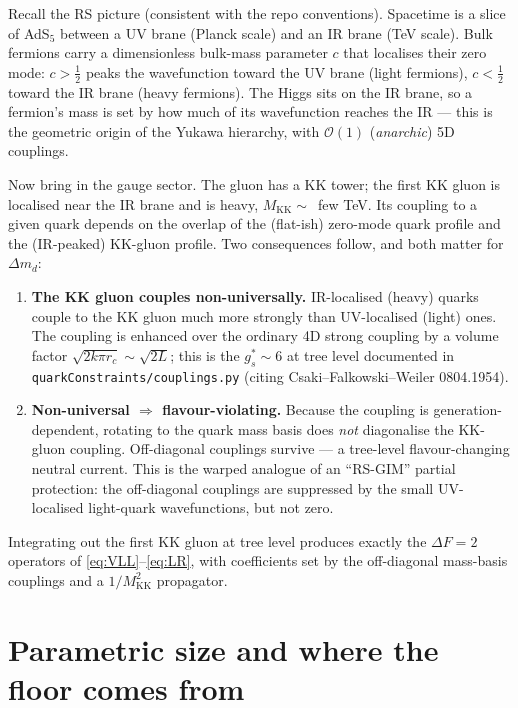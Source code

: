 \documentclass[11pt]{article}
\newcommand{\MKK}{M_{\mathrm{KK}}}
\newcommand{\dmd}{\Delta m_d}
\newcommand{\code}[1]{\texttt{#1}}
\theoremstyle{definition}
\begin{document}
Recall the RS picture (consistent with the repo conventions). Spacetime is a
slice of AdS$_5$ between a UV brane (Planck scale) and an IR brane (TeV scale).
Bulk fermions carry a dimensionless bulk-mass parameter $c$ that localises their
zero mode: $c>\tfrac12$ peaks the wavefunction toward the UV brane (light
fermions), $c<\tfrac12$ toward the IR brane (heavy fermions). The Higgs sits on
the IR brane, so a fermion's mass is set by how much of its wavefunction reaches
the IR --- this is the geometric origin of the Yukawa hierarchy, with
$\mathcal{O}(1)$ (\emph{anarchic}) 5D couplings.

Now bring in the gauge sector. The gluon has a KK tower; the first KK gluon is
localised near the IR brane and is heavy, $\MKK\sim$~few TeV. Its coupling to a
given quark depends on the overlap of the (flat-ish) zero-mode quark profile and
the (IR-peaked) KK-gluon profile. Two consequences follow, and both matter for
$\dmd$:
\begin{enumerate}[leftmargin=1.6em]
\item \textbf{The KK gluon couples non-universally.} IR-localised (heavy) quarks
couple to the KK gluon much more strongly than UV-localised (light) ones. The
coupling is enhanced over the ordinary 4D strong coupling by a volume factor
$\sqrt{2k\pi r_c}\sim\sqrt{2L}$; this is the $g_s^*\sim 6$ at tree level
documented in \code{quarkConstraints/couplings.py} (citing
Csaki--Falkowski--Weiler 0804.1954).
\item \textbf{Non-universal $\Rightarrow$ flavour-violating.} Because the coupling
is generation-dependent, rotating to the quark mass basis does \emph{not}
diagonalise the KK-gluon coupling. Off-diagonal couplings survive --- a
tree-level flavour-changing neutral current. This is the warped analogue of an
``RS-GIM'' partial protection: the off-diagonal couplings are suppressed by the
small UV-localised light-quark wavefunctions, but not zero.
\end{enumerate}
Integrating out the first KK gluon at tree level produces exactly the
$\Delta F=2$ operators of \eqref{eq:VLL}--\eqref{eq:LR}, with coefficients set by
the off-diagonal mass-basis couplings and a $1/\MKK^2$ propagator.

\section{Parametric size and where the floor comes from}
\label{sec:parametric}
\end{document}
